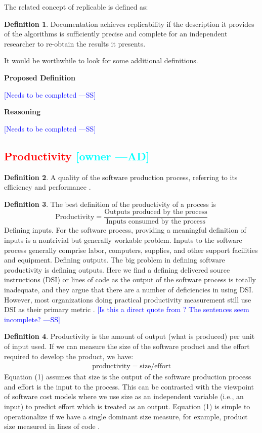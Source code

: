 \documentclass[letterpaper,cleveref]{lipics-v2019}
\newcommand{\authornote}[3]{\textcolor{#1}{[#3 ---#2]}}
\newcommand{\authornote}[3]{}
\newcommand{\wss}[1]{\authornote{blue}{SS}{#1}} %
\newcommand{\ad}[1]{\authornote{cyan}{AD}{#1}} %
\newcommand{\notdone}[1]{\textcolor{red}{#1}}
\theoremstyle{definition}
\newtheorem{defn}{Definition}
\begin{document}
The related concept of replicable is defined as:

\begin{defn}
Documentation achieves replicability if the description it provides of the
algorithms is sufficiently precise and complete for an independent researcher to
re-obtain the results it presents.  \citep{BenureauAndRougier2017}
\end{defn}

It would be worthwhile to look for some additional definitions.

\noindent \textbf{Proposed Definition} 

\wss{Needs to be completed}

\noindent \textbf{Reasoning}

\wss{Needs to be completed}

\subsection{\notdone{Productivity} \ad{owner}}

\begin{defn}
A quality of the software production process, referring to its efficiency and
performance \citep{ghezzi1991fundamentals}.
\end{defn}
\begin{defn}
The best definition of the productivity of a process is
\[\text{Productivity} = \dfrac{\text{Outputs produced by the
      process}}{\text{Inputs consumed by the process}}\] Defining inputs. For
the software process, providing a meaningful definition of inputs is a
nontrivial but generally workable problem. Inputs to the software process
generally comprise labor, computers, supplies, and other support facilities and
equipment. Defining outputs. The big problem in defining software productivity
is defining outputs. Here we find a defining delivered source instructions (DSI)
or lines of code as the output of the software process is totally inadequate,
and they argue that there are a number of deficiencies in using DSI. However,
most organizations doing practical productivity measurement still use DSI as
their primary metric \citep{Boehm1987}. \wss{Is this a direct quote from
  \citet{Boehm1987}?  The sentences seem incomplete?}
\end{defn}
\begin{defn}
\label{ProductivitySelected}
Productivity is the amount of output (what is produced) per unit of input
used. If we can measure the size of the software product and the effort required
to develop the product, we have:
\begin{align}
\text{productivity} = \text{size}/\text{effort}
\end{align}
Equation (1) assumes that size is the output of the software production process
and effort is the input to the process. This can be contrasted with the
viewpoint of software cost models where we use size as an independent variable
(i.e., an input) to predict effort which is treated as an output. Equation (1)
is simple to operationalize if we have a single dominant size measure, for
example, product size measured in lines of code \citep{Kitchenham2004}.
\end{defn}
\end{document}
